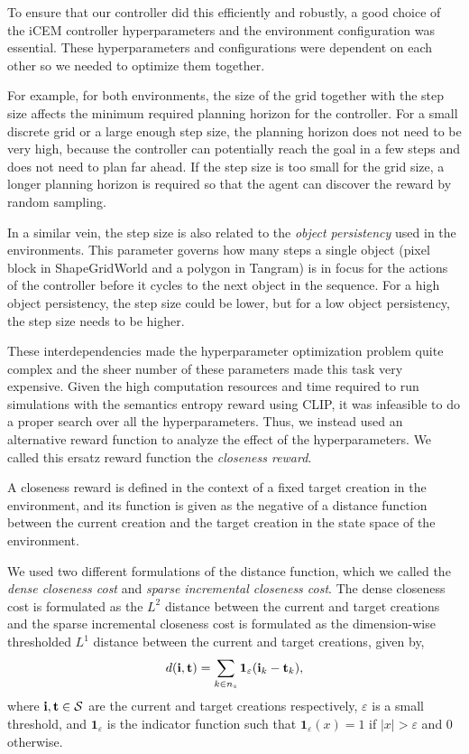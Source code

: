 To ensure that our controller did this efficiently and robustly, a good choice of the iCEM controller hyperparameters and the environment configuration was essential.
These hyperparameters and configurations were dependent on each other so we needed to optimize them together.

For example, for both environments, the size of the grid together with the step size affects the minimum required planning horizon for the controller.
For a small discrete grid or a large enough step size, the planning horizon does not need to be very high, because the controller can potentially reach the goal in a few steps and does not need to plan far ahead.
If the step size is too small for the grid size, a longer planning horizon is required so that the agent can discover the reward by random sampling.

In a similar vein, the step size is also related to the \emph{object persistency} used in the environments.
This parameter governs how many steps a single object (pixel block in ShapeGridWorld and a polygon in Tangram) is in focus for the actions of the controller before it cycles to the next object in the sequence.
For a high object persistency, the step size could be lower, but for a low object persistency, the step size needs to be higher.

These interdependencies made the hyperparameter optimization problem quite complex and the sheer number of these parameters made this task very expensive.
Given the high computation resources and time required to run simulations with the semantics entropy reward using CLIP, it was infeasible to do a proper search over all the hyperparameters.
Thus, we instead used an alternative reward function to analyze the effect of the hyperparameters.
We called this ersatz reward function the \emph{closeness reward}.

A closeness reward is defined in the context of a fixed target creation in the environment, and its function is given as the negative of a distance function between the current creation and the target creation in the state space of the environment.

We used two different formulations of the distance function, which we called the \emph{dense closeness cost} and \emph{sparse incremental closeness cost}.
The dense closeness cost is formulated as the \(L^2\) distance between the current and target creations and the sparse incremental closeness cost is formulated as the dimension-wise thresholded \(L^1\) distance between the current and target creations, given by,
\begin{equation}
    \label{eq:closeness-reward-sparse}
    d(\mathbf{i}, \mathbf{t}) = \sum_{k \in n_s} \bm{1}_\varepsilon(\mathbf{i}_k - \mathbf{t}_k),
\end{equation}
where \(\mathbf{i}, \mathbf{t} \in \mathcal{S}\) are the current and target creations respectively, \(\varepsilon\) is a small threshold, and \(\bm{1}_\varepsilon\) is the indicator function such that \(\bm{1}_\varepsilon(x) = 1\) if \(|x| > \varepsilon\) and \(0\) otherwise.

